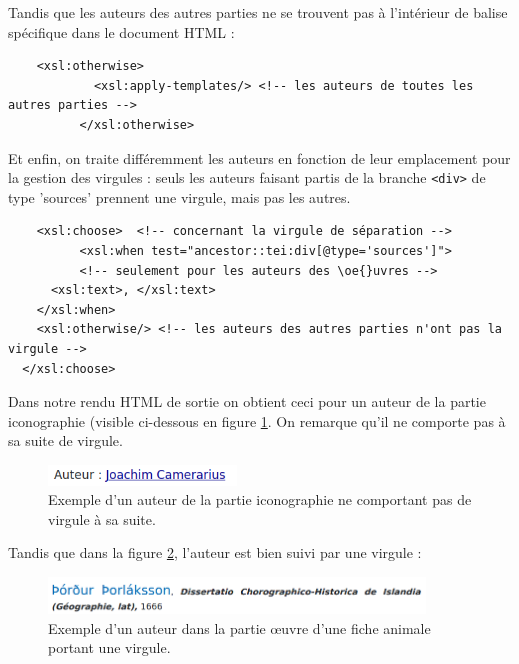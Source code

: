 \documentclass[a4paper,12pt,twoside]{book}
\begin{document}
    Tandis que les auteurs des autres parties ne se trouvent pas à l'intérieur de balise spécifique dans le document HTML :
    
    \begin{verbatim}
    <xsl:otherwise>
            <xsl:apply-templates/> <!-- les auteurs de toutes les autres parties -->
          </xsl:otherwise>
    \end{verbatim}
    
    Et enfin, on traite différemment les auteurs en fonction de leur emplacement pour la gestion des virgules : seuls les auteurs faisant partis de la branche \texttt{<div>} de type 'sources' prennent une virgule, mais pas les autres.
    
    \begin{verbatim}
    <xsl:choose>  <!-- concernant la virgule de séparation -->
          <xsl:when test="ancestor::tei:div[@type='sources']">
          <!-- seulement pour les auteurs des \oe{}uvres -->
      <xsl:text>, </xsl:text>
    </xsl:when>
    <xsl:otherwise/> <!-- les auteurs des autres parties n'ont pas la virgule -->
  </xsl:choose>
    \end{verbatim}
    
    Dans notre rendu HTML de sortie on obtient ceci pour un auteur de la partie iconographie (visible ci-dessous en figure \ref{aut}. On remarque qu'il ne comporte pas à sa suite de virgule.
    
   \begin{figure}[H]
       \centering
       \includegraphics[width=5cm]{img/autre/auteur_icono.png}
       \caption{Exemple d'un auteur de la partie iconographie ne comportant pas de virgule à sa suite.}
       \label{aut}
   \end{figure}

    Tandis que dans la figure \ref{auteurvir}, l'auteur est bien suivi par une virgule :
    
    \begin{figure}[H]
        \centering
        \includegraphics[width=10cm]{img/autre/auteur_virgule.png}
        \caption{Exemple d'un auteur dans la partie \oe{}uvre d'une fiche animale portant une virgule.}
        \label{auteurvir}
    \end{figure}
    
\end{document}
